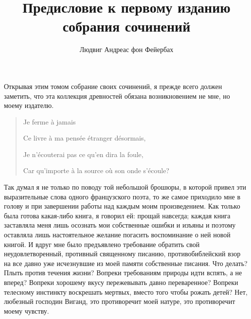 \documentclass[12pt]{article}
\title{Предисловие к первому изданию собрания сочинений}
\author{Людвиг Андреас фон Фейербах}
\date{}
\begin{document}
\maketitle

\newpage

Открывая этим томом собрание своих сочинений, 
я прежде всего должен заметить, что эта коллекция 
древностей обязана возникновением не мне, но моему 
издателю.

\begin{quote}

Je ferme \`a jamais 

Ce livre \`a ma pens\'ee \'etranger d\'esormais, 

Je n'\'ecouterai pas ce qu'en dira la foule, 

Car qu'importe \`a la source o\`u son onde s'\'ecoule?

\end{quote}


Так думал я не только по поводу той небольшой  
брошюры, в которой привел эти выразительные слова  
одного французского поэта, то же самое приходило мне в голову и при завершении работы над каждым моим 
произведением. Как только была готова какая-либо 
книга, я говорил ей: прощай навсегда; каждая книга 
заставляла меня лишь осознать мои собственные  
ошибки и изъяны и поэтому оставляла лишь настоятельное желание погасить воспоминание о ней новой книгой. 
И вдруг мне было предъявлено требование обратить 
свой неудовлетворенный, противный священному  
писанию, противобиблейский взор на все давно уже  
исчезнувшие из моей памяти собственные писания. Что  
делать? Плыть против течения жизни? Вопреки  
требованиям природы идти вспять, а не вперед? Вопреки 
хорошему вкусу пережевывать давно переваренное? 
Вопреки телесному инстинкту воскрешать мертвых, 
вместо того чтобы рожать детей? Нет, любезный господин Виганд, это противоречит моей натуре, это  
противоречит моему чувству. 
\end{document}
